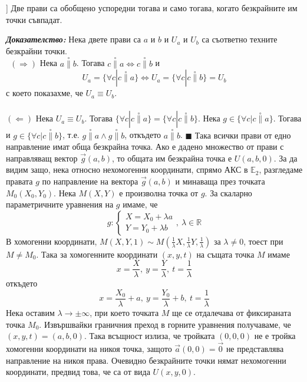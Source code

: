 \documentclass[12pt]{article}
\begin{document}
{\begin{tcolorbox}
]  Две прави са обобщено успоредни тогава и само тогава, когато безкрайните им точки съвпадат.
\end{tcolorbox}
\textbf{\textit{Доказателство:}} Нека двете прави са $a$ и $b$ и $U_a$ и $U_b$ са съответно техните безкрайни точки.\\
\
$(\Rightarrow)$ Нека $a\overset{\circ}{\parallel}b$. Тогава $c\overset{\circ}{\parallel} a\Leftrightarrow c\overset{\circ}{\parallel} b$ и $$U_a=\lbrace \forall c | c \overset{\circ}{\parallel}a\rbrace\Leftrightarrow U_a=\lbrace \forall c | c \overset{\circ}{\parallel}b\rbrace=U_b$$ с което показахме, че $U_a\equiv U_b$.\\
\\
$(\Leftarrow)$ Нека $U_a\equiv U_b$. Тогава $\lbrace \forall c | c \overset{\circ}{\parallel}a\rbrace=\lbrace \forall c | c \overset{\circ}{\parallel}b\rbrace$. Нека $g\in\lbrace \forall c | c \overset{\circ}{\parallel}a\rbrace$. Тогава и $g\in\lbrace \forall c | c \overset{\circ}{\parallel}b\rbrace$, т.е. $g\overset{\circ}{\parallel}a\wedge g\overset{\circ}{\parallel} b$, откъдето $a\overset{\circ}{\parallel}b$. $\blacksquare$
\vspace{0.5cm}
\Large{Така всички прави от едно направление имат обща безкрайна точка. Ако е дадено множество от прави с направляващ вектор $\vec{g}(a,b)$, то общата им безкрайна точка е $U(a,b,0)$. За да видим защо, нека относно нехомогенни координати, спрямо АКС в $\mathbb{E}_2$, разгледаме правата $g$ по направление на вектора $\vec{g}(a,b)$ и минаваща през точката $M_0(X_0,Y_0)$. Нека $M(X,Y)$ е произволна точка от $g$. За скаларно параметричните уравнения на $g$ имаме, че $$g:\begin{cases}X=X_0+\lambda a\\ Y=Y_0+\lambda b\end{cases},\ \lambda\in\mathbb{R}$$ В хомогенни координати, $M(X,Y,1)\sim M\left(\frac{1}{\lambda}X,\frac{1}{\lambda}Y,\frac{1}{\lambda}\right)$ за $\lambda\neq 0$, тоест при $M\neq M_0$. Така за хомогенните координати $(x,y,t)$ на същата точка $M$ имаме $$x=\dfrac{X}{\lambda},\ y=\dfrac{Y}{\lambda},\ t=\dfrac{1}{\lambda}$$ откъдето $$x=\dfrac{X_0}{\lambda}+a,\ y=\dfrac{Y_0}{\lambda}+b,\ t=\dfrac{1}{\lambda}$$
Нека оставим $\lambda\to\pm\infty$, при което точката $M$ ще се отдалечава от фиксираната точка $M_0$. Извършвайки граничния преход в горните уравнения получаваме, че $(x,y,t)=(a,b,0)$. Така всъщност излиза, че тройката $(0,0,0)$ не е тройка хомогенни координати на никоя точка, защото $\vec{a}(0,0)=\vec{0}$ не представлява направление на никоя права. Очевидно безкрайните точки нямат нехомогенни координати, предвид това, че са от вида $U(x,y,0)$.
}}
\end{document}
